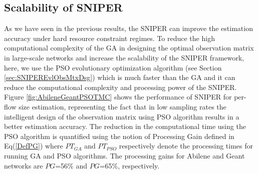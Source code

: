 

\subsection{Scalability of SNIPER}
As we have seen in the previous results, the SNIPER can improve the estimation accuracy under hard resource constraint regimes. To reduce the high computational complexity of the GA in designing the optimal observation matrix in large-scale networks and increase the scalability of the SNIPER framework, here, we use the PSO evolutionary optimization algorithm (see Section \ref{sec:SNIPEREvlObsMtxDsg}) which is much faster than the GA \cite{Talib:2009}\cite{Kachitvichyanuku:2012} and it can reduce the computational complexity and processing power of the SNIPER. Figure \ref{fig:AbileneGeantPSOTMC} shows the performance of SNIPER for per-flow size estimation, representing the fact that in low sampling rates the intelligent design of the observation matrix using PSO algorithm results in a better estimation accuracy. The reduction in the computational time using the PSO algorithm is quantified using the notion of Processing Gain defined in Eq(\ref{DefPG}) where $PT_{GA}$ and $PT_{PSO}$ respectively denote the processing times for running GA and PSO algorithms. The processing gains for Abilene and Geant networks are $PG$=56\% and $PG$=65\%, respectively. 

